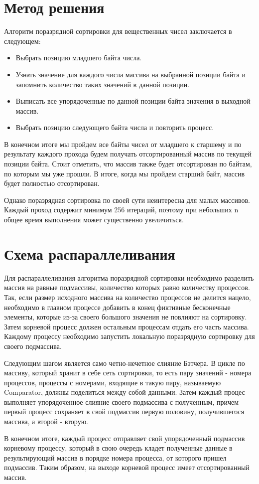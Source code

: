 \documentclass{report}
\begin{document}
\section*{Метод решения}
Алгоритм поразрядной сортировки для вещественных чисел заключается в следующем:
\begin{itemize}
\item Выбрать позицию младшего байта числа.
\item Узнать значение для каждого числа массива на выбранной позиции байта и запомнить количество таких значений в данной позиции.
\item Выписать все упорядоченные по данной позиции байта значения в выходной массив.
\item Выбрать позицию следующего байта числа и повторить процесс.
\end{itemize}
\par В конечном итоге мы пройдем все байты чисел от младшего к старшему и по результату каждого прохода будем получать отсортированный массив по текущей позиции байта. Стоит отметить, что массив также будет отсортирован по байтам, по которым мы уже прошли. В итоге, когда мы пройдем старший байт, массив будет полностью отсортирован.
\par Однако поразрядная сортировка по своей сути неинтересна для малых массивов. Каждый проход содержит минимум 256 итераций, поэтому при небольших n общее время выполнения может существенно увеличиться.
\newpage

\section*{Схема распараллеливания}
Для распараллеливания алгоритма поразрядной сортировки необходимо разделить массив на равные подмассивы, количество которых равно количеству процессов. Так, если размер исходного массива на количество процессов не делится нацело, необходимо в главном процессе добавить в конец фиктивные бесконечные элементы, которые из-за своего большого значения не повлияют на сортировку. Затем корневой процесс должен остальным процессам отдать его часть массива. Каждому процессу необходимо запустить локальную поразрядную сортировку для своего подмассива.
\par Следующим шагом является само четно-нечетное слияние Бэтчера. В цикле по массиву, который хранит в себе сеть сортировки, то есть пару значений - номера процессов, процессы с номерами, входящие в такую пару, называемую Comparator, должны поделиться между собой данными. Затем каждый процес выполняет упорядоченное слияние своего подмассива с полученным, причем первый процесс сохраняет в свой подмассив первую половину, получившегося массива, а второй - вторую.
\par В конечном итоге, каждый процесс отправляет свой упорядоченный подмассив корневому процессу, который в свою очередь кладет полученные данные в результирующий массив в порядке номера процесса, от которого пришел подмассив. Таким образом, на выходе корневой процесс имеет отсортированный массив.
\newpage
\end{document}
